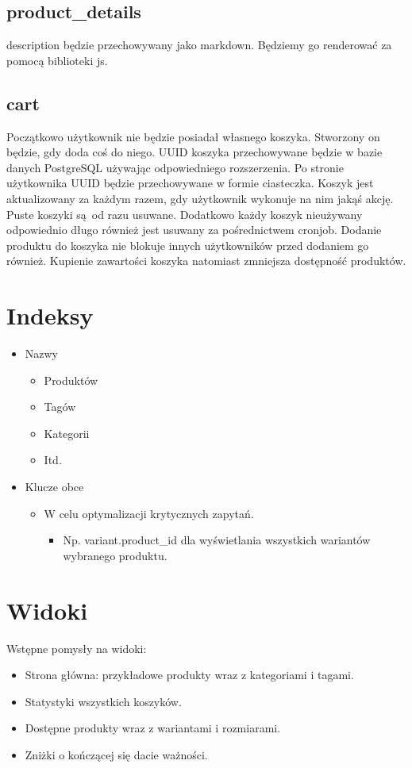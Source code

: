 \subsection*{product\_details}
description będzie przechowywany jako markdown. Będziemy go renderować za pomocą biblioteki js.

\subsection*{cart}
Początkowo użytkownik nie będzie posiadał własnego koszyka. Stworzony on będzie, gdy doda coś do niego. UUID koszyka przechowywane będzie w bazie danych PostgreSQL używając odpowiedniego rozszerzenia. Po stronie użytkownika UUID będzie przechowywane w formie ciasteczka. Koszyk jest aktualizowany za każdym razem, gdy użytkownik wykonuje na nim jakąś akcję. Puste koszyki są od razu usuwane. Dodatkowo każdy koszyk nieużywany odpowiednio długo również jest usuwany za pośrednictwem cronjob. Dodanie produktu do koszyka nie blokuje innych użytkowników przed dodaniem go również. Kupienie zawartości koszyka natomiast zmniejsza dostępność produktów.

\section*{Indeksy}
\begin{itemize}
    \item Nazwy
        \begin{itemize}
            \item Produktów
            \item Tagów
            \item Kategorii
            \item Itd.
        \end{itemize}
    \item Klucze obce
        \begin{itemize}
            \item W celu optymalizacji krytycznych zapytań.
                    \begin{itemize}
                        \item Np. variant.product\_id dla wyświetlania wszystkich wariantów wybranego produktu.
                    \end{itemize}
        \end{itemize}
\end{itemize}

\section*{Widoki}
Wstępne pomysły na widoki:
\begin{itemize}
    \item Strona główna: przykładowe produkty wraz z kategoriami i tagami.
    \item Statystyki wszystkich koszyków.
    \item Dostępne produkty wraz z wariantami i rozmiarami.
    \item Zniżki o kończącej się dacie ważności.
\end{itemize}

